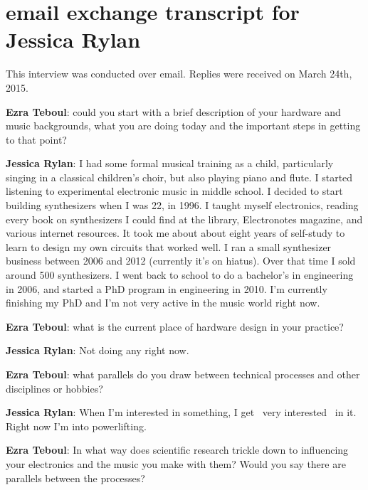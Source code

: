 \newpage

\clearpage 
\section{email exchange transcript for Jessica Rylan}
This interview was conducted over email. Replies were received on March 24th, 2015. 

\textbf{Ezra Teboul}: could you start with a brief description of your hardware and music backgrounds, what you are doing today and the important steps in getting to that point? 

\textbf{Jessica Rylan}: I had some formal musical training as a child, particularly singing in a classical children's choir, but also playing piano and flute. I started listening to experimental electronic music in middle school. I decided to start building synthesizers when I was 22, in 1996. I taught myself electronics, reading every book on synthesizers I could find at the library, Electronotes magazine, and various internet resources. It took me about about eight years of self-study to learn to design my own circuits that worked well. I ran a small synthesizer business between 2006 and 2012 (currently it's on hiatus). Over that time I sold around 500 synthesizers. I went back to school to do a bachelor's in engineering in 2006, and started a PhD program in engineering in 2010. I'm currently finishing my PhD and I'm not very active in the music world right now.

\textbf{Ezra Teboul}: what is the current place of hardware design in your practice? 

\textbf{Jessica Rylan}: Not doing any right now.

\textbf{Ezra Teboul}: what parallels do you draw between technical processes and other disciplines or hobbies? 

\textbf{Jessica Rylan}: When I'm interested in something, I get ~very interested~ in it. Right now I'm into powerlifting.

\textbf{Ezra Teboul}: In what way does scientific research trickle down to influencing your electronics and the music you make with them? Would you say there are parallels between the processes? 
            

